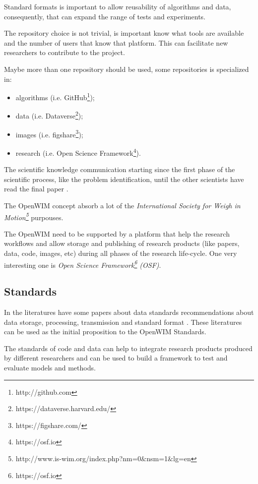 \documentclass[a4paper]{article}
\begin{document}
{Standard formats is important to allow reusability of algorithms and data, consequently, that can expand the range of tests and experiments.

The repository choice is not trivial, is important know what tools are available and the number of users that know that platform. This can facilitate new researchers to contribute to the project.

Maybe more than one repository should be used, some repositories is specialized in:

\begin{itemize}
\item algorithms (i.e. GitHub\footnote{http://github.com});
\item data (i.e. Dataverse\footnote{https://dataverse.harvard.edu/});
\item images (i.e. figshare\footnote{https://figshare.com/});
\item research (i.e. Open Science Framework\footnote{https://osf.io}).
\end{itemize}

The scientific knowledge communication starting since the first phase of the scientific process, like the problem identification, until the other scientists have read the final paper \cite{leite2007scientific}.

The OpenWIM concept absorb a lot of the \textit{International Society for Weigh in Motion\footnote{http://www.is-wim.org/index.php?nm=0$\&$nsm=1$\&$lg=en}} purpouses.

The OpenWIM need to be supported by a platform that help the research workflows and allow storage and publishing of research products (like papers, data, code, images, etc) during all phases of the research life-cycle. One very interesting one is \textit{Open Science Framework\footnote{https://osf.io} (OSF)}.

\subsection{Standards}\label{standards}

In the literatures have some papers about data standards recommendations about data storage, processing, transmission and standard format \cite{tech:cost-323, enright2011cleaning, qu1997traffic, elkins2008development}. These literatures can be used as the initial proposition to the OpenWIM Standards.

The standards of code and data can help to integrate research products produced by different researchers and can be used to build a framework to test and evaluate models and methods.

}
\end{document}
